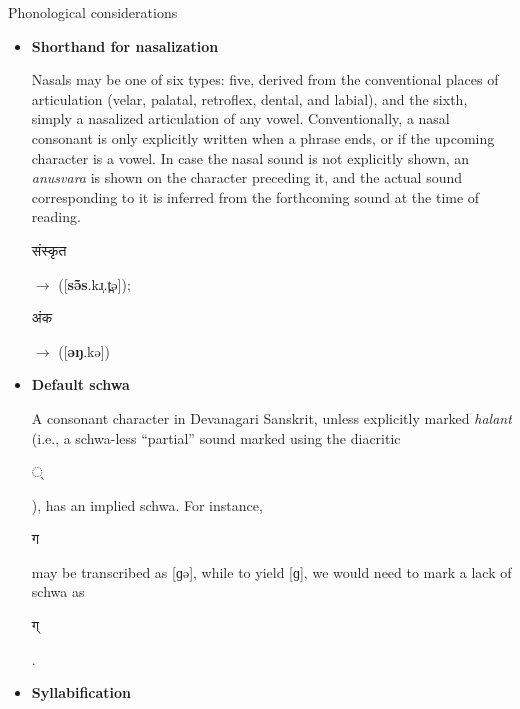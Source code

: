 \documentclass[final]{beamer}
\newcommand{\sansk}[1]{\begin{sanskrit}#1\end{sanskrit}}  %
\newlength{\twocolwid}
\begin{document}
\begin{frame}[t]
\begin{columns}[t]
\begin{column}{\twocolwid}
                
                \begin{block}{Phonological considerations}
                
                    \begin{itemize}
                    
                        \item {\bfseries Shorthand for nasalization}
                            
                            Nasals may be one of six types: five, derived from
                            the conventional places of articulation (velar, palatal,
                            retroflex, dental, and labial), and the sixth, simply a
                            nasalized articulation of any vowel.
                            Conventionally, a nasal consonant is only explicitly
                            written when a phrase ends, or if the upcoming character is a vowel.
                            In case the nasal sound is not explicitly shown, an {\it anusvara}
                            is shown on the character preceding it, and the actual sound
                            corresponding to it is inferred from the forthcoming sound at the time of reading.
                        
                            \sansk{संस्कृत} $\rightarrow$ ([\textbf{sə̃̃s}.kɹ̩.t̪ə]);\quad
                            \sansk{अंक} $\rightarrow$ ([\textbf{əŋ}.kə])
                        
                        \item {\bfseries Default schwa}
                        
                            A consonant character in Devanagari Sanskrit, unless explicitly
                            marked {\it halant} (i.e., a schwa-less ``partial'' sound marked
                            using the diacritic \sansk{्}), has an implied schwa. For instance,
                            \sansk{ग} may be transcribed as [ɡə], while to yield [ɡ], we would
                            need to mark a lack of schwa as \sansk{ग्}.
                        
                        \item {\bfseries Syllabification}
                        

\end{itemize}
\end{block}
\end{column}
\end{columns}
\end{frame}
\end{document}
